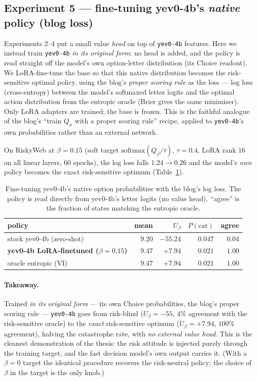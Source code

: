 \documentclass[11pt]{article}
\newcommand{\Ubeta}{U_{\beta}}
\begin{document}
\subsection{Experiment 5 --- fine-tuning yev0-4b's \emph{native} policy (blog loss)}
\label{sec:finetune}
Experiments 2--4 put a small value \emph{head} on top of \texttt{yev0-4b} features.
Here we instead train \texttt{yev0-4b} \emph{in its original form}: no head is added,
and the policy is read straight off the model's own option-letter distribution (its
Choice readout). We LoRA-fine-tune the base so that this native distribution becomes
the risk-sensitive optimal policy, using the blog's \emph{proper scoring rule} as the
loss --- log loss (cross-entropy) between the model's softmaxed letter logits and the
optimal action distribution from the entropic oracle (Brier gives the same minimiser).
Only LoRA adapters are trained; the base is frozen. This is the faithful analogue of
the blog's ``train $Q_\phi$ with a proper scoring rule'' recipe, applied to
\texttt{yev0-4b}'s own probabilities rather than an external network.

On RiskyWeb at $\beta{=}0.15$ (soft target $\mathrm{softmax}(Q_\beta/\tau)$,
$\tau{=}0.4$, LoRA rank $16$ on all linear layers, $60$ epochs), the log loss falls
$1.24\!\to\!0.26$ and the model's \emph{own} policy becomes the exact
risk-sensitive optimum (Table~\ref{tab:finetune}).

\begin{table}[H]\centering\small
\caption{Fine-tuning yev0-4b's native option probabilities with the blog's log
loss. The policy is read directly from yev0-4b's letter logits (no value head).
``agree'' is the fraction of states matching the entropic oracle.}
\label{tab:finetune}
\begin{tabular}{@{}lrrrr@{}}
\toprule
policy & mean & $\Ubeta$ & $P(\text{cat})$ & agree\\
\midrule
stock yev0-4b (zero-shot) & $9.20$ & $-55.24$ & $0.047$ & $0.04$\\
\textbf{yev0-4b LoRA-finetuned ($\beta{=}0.15$)} & $9.47$ & $\mathbf{+7.94}$ & $0.021$ & $\mathbf{1.00}$\\
oracle entropic (VI) & $9.47$ & $+7.94$ & $0.021$ & $1.00$\\
\bottomrule
\end{tabular}
\end{table}

\paragraph{Takeaway.} Trained \emph{in its original form} --- its own Choice
probabilities, the blog's proper scoring rule --- \texttt{yev0-4b} goes from
risk-blind ($\Ubeta=-55$, $4\%$ agreement with the risk-sensitive oracle) to the
\emph{exact} risk-sensitive optimum ($\Ubeta=+7.94$, $100\%$ agreement), halving the
catastrophe rate, with \emph{no external value head}. This is the cleanest
demonstration of the thesis: the risk attitude is injected purely through the
training target, and the fast decision model's own output carries it. (With a
$\beta{=}0$ target the identical procedure recovers the risk-neutral policy; the
choice of $\beta$ in the target is the only knob.)
\end{document}
